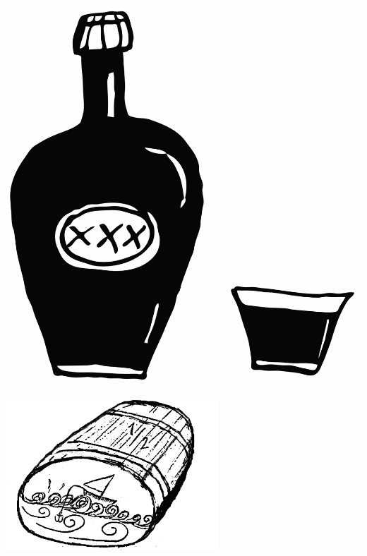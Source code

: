 %

\begin{intersong}
\sffamily\bfseries\LARGE{}
\begin{center}
	\vspace{10mm}
\includegraphics[width=1\textwidth]{../bilder/fardigabilder/BilderTillKapitel/brannvin.png} 
\end{center}
\end{intersong}

\sclearpage







\begin{intersong}
	\begin{center}
		\includegraphics[width=0.6\textwidth]{../bilder/fardigabilder/CamillasFardigaBilder/Halvankaren2.png} 
	\end{center}
\end{intersong}
